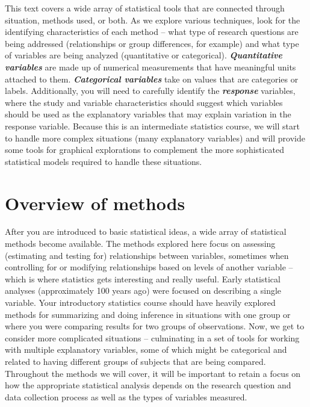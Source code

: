 \documentclass[]{book}
\begin{document}
This text covers a wide array of statistical tools that are connected
through situation, methods used, or both. As we explore various
techniques, look for the identifying characteristics of each method --
what type of research questions are being addressed (relationships or
group differences, for example) and what type of variables are being
analyzed (quantitative or categorical). \textbf{\emph{Quantitative
variables}} are made up of numerical measurements that have meaningful
units attached to them. \textbf{\emph{Categorical variables}} take on
values that are categories or labels. Additionally, you will need to
carefully identify the \textbf{\emph{response}} variables, where the
study and variable characteristics should suggest which variables should
be used as the explanatory variables that may explain variation in the
response variable. Because this is an intermediate statistics course, we
will start to handle more complex situations (many explanatory
variables) and will provide some tools for graphical explorations to
complement the more sophisticated statistical models required to handle
these situations.

\section{Overview of methods}\label{overview-of-methods}

After you are introduced to basic statistical ideas, a wide array of
statistical methods become available. The methods explored here focus on
assessing (estimating and testing for) relationships between variables,
sometimes when controlling for or modifying relationships based on
levels of another variable -- which is where statistics gets interesting
and really useful. Early statistical analyses (approximately 100 years
ago) were focused on describing a single variable. Your introductory
statistics course should have heavily explored methods for summarizing
and doing inference in situations with one group or where you were
comparing results for two groups of observations. Now, we get to
consider more complicated situations -- culminating in a set of tools
for working with multiple explanatory variables, some of which might be
categorical and related to having different groups of subjects that are
being compared. Throughout the methods we will cover, it will be
important to retain a focus on how the appropriate statistical analysis
depends on the research question and data collection process as well as
the types of variables measured.
\end{document}
